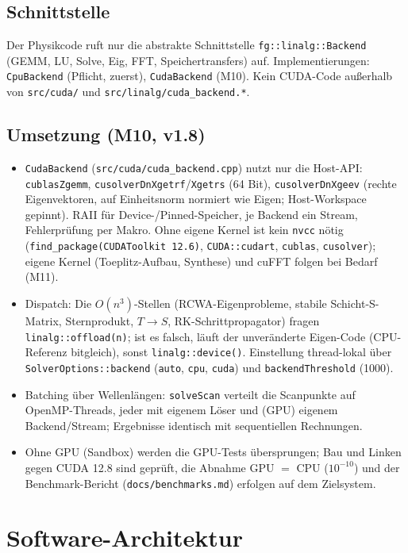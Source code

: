 \subsection{Schnittstelle}
Der Physikcode ruft nur die abstrakte Schnittstelle \verb|fg::linalg::Backend| (GEMM, LU, Solve, Eig,
FFT, Speichertransfers) auf. Implementierungen: \verb|CpuBackend| (Pflicht, zuerst), \verb|CudaBackend|
(M10). Kein CUDA-Code außerhalb von \verb|src/cuda/| und \verb|src/linalg/cuda_backend.*|.

\subsection{Umsetzung (M10, v1.8)}
\begin{itemize}[nosep]
  \item \verb|CudaBackend| (\verb|src/cuda/cuda_backend.cpp|) nutzt nur die Host-API: \verb|cublasZgemm|,
        \verb|cusolverDnXgetrf|/\verb|Xgetrs| (64 Bit), \verb|cusolverDnXgeev| (rechte Eigenvektoren, auf
        Einheitsnorm normiert wie Eigen; Host-Workspace gepinnt). RAII für Device-/Pinned-Speicher, je Backend
        ein Stream, Fehlerprüfung per Makro. Ohne eigene Kernel ist kein \verb|nvcc| nötig
        (\verb|find_package(CUDAToolkit 12.6)|, \verb|CUDA::cudart|, \verb|cublas|, \verb|cusolver|); eigene
        Kernel (Toeplitz-Aufbau, Synthese) und cuFFT folgen bei Bedarf (M11).
  \item Dispatch: Die $O(n^3)$-Stellen (RCWA-Eigenprobleme, stabile Schicht-S-Matrix, Sternprodukt, $T\to S$,
        RK-Schrittpropagator) fragen \verb|linalg::offload(n)|; ist es falsch, läuft der unveränderte
        Eigen-Code (CPU-Referenz bitgleich), sonst \verb|linalg::device()|. Einstellung thread-lokal über
        \verb|SolverOptions::backend| (\verb|auto|, \verb|cpu|, \verb|cuda|) und \verb|backendThreshold| (1000).
  \item Batching über Wellenlängen: \verb|solveScan| verteilt die Scanpunkte auf OpenMP-Threads, jeder mit
        eigenem Löser und (GPU) eigenem Backend/Stream; Ergebnisse identisch mit sequentiellen Rechnungen.
  \item Ohne GPU (Sandbox) werden die GPU-Tests übersprungen; Bau und Linken gegen CUDA 12.8 sind geprüft,
        die Abnahme GPU $=$ CPU ($10^{-10}$) und der Benchmark-Bericht (\verb|docs/benchmarks.md|) erfolgen auf
        dem Zielsystem.
\end{itemize}

\section{Software-Architektur}\label{sec:arch}

